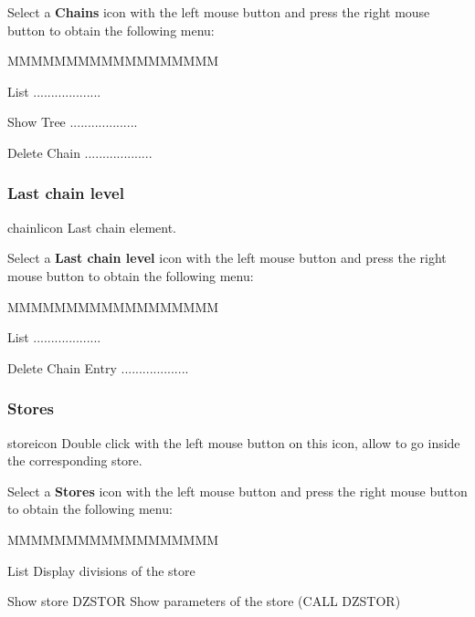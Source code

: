 Select a {\bf Chains} icon with the left mouse button and press
the right mouse button to obtain the following menu:


\begin{DLsf}{MMMMMMMMMMMMMMMMMM}
\item[List]                      ...................
\item[Show Tree]                 ...................
\item[Delete Chain]              ...................
\end{DLsf}


\subsubsection{Last chain level}
\begin{ICON}{chainlicon}
Last chain element.
\end{ICON}

Select a {\bf Last chain level} icon with the left mouse button and press
the right mouse button to obtain the following menu:


\begin{DLsf}{MMMMMMMMMMMMMMMMMM}
\item[List]                      ...................
\item[Delete Chain Entry]        ...................
\end{DLsf}


\subsubsection{\ZEBRA{} Stores}
\begin{ICON}{storeicon}
Double click with the left mouse button on this icon, allow to go inside the
corresponding \ZEBRA{} store.
\end{ICON}

Select a {\bf \ZEBRA{} Stores} icon with the left mouse button and press
the right mouse button to obtain the following menu:


\begin{DLsf}{MMMMMMMMMMMMMMMMMM}
\item[List]                      Display divisions of the store 
\item[Show store DZSTOR]         Show parameters of the store (CALL DZSTOR)
\end{DLsf}


